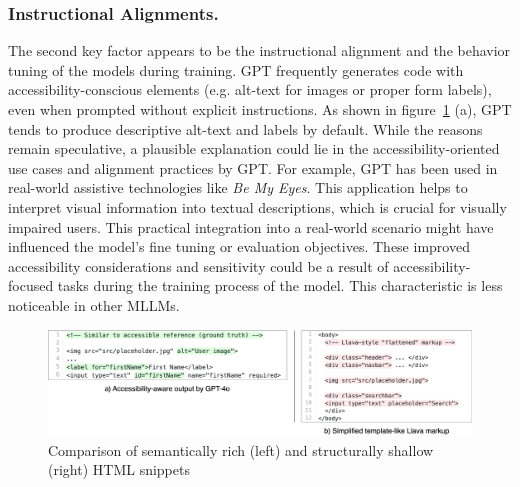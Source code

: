 \subsubsection{Instructional Alignments.} The second key 
factor appears to be the instructional alignment
and the behavior tuning of the models during training. GPT 
frequently generates code with accessibility-conscious elements
(e.g. alt-text for images or proper form labels), even when 
prompted without explicit instructions. As shown in 
figure~\ref{fig:generalcapabilities} (a), GPT tends to produce 
descriptive alt-text and labels by default.\newline
While the reasons remain speculative, a plausible explanation 
could lie in the accessibility-oriented use cases and 
alignment practices by GPT. For example, GPT has been used 
in real-world assistive technologies like \textit{Be My Eyes}. 
This application helps to interpret visual information into 
textual descriptions, which is crucial for visually impaired users.
This practical integration into a real-world scenario might 
have influenced the model's fine tuning or evaluation objectives.
These improved accessibility considerations and sensitivity could 
be a result of accessibility-focused tasks during the training 
process of the model. This characteristic is less noticeable in 
other MLLMs.

\begin{figure}
  \centering
  \includegraphics[width=1\linewidth]{figures/generalcapability.png}
  \caption{Comparison of semantically rich (left) and structurally shallow (right) HTML snippets}
  \label{fig:generalcapabilities} 
\end{figure}

